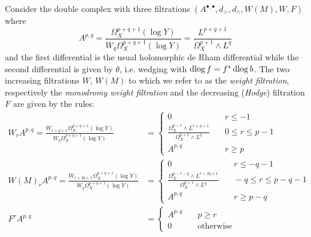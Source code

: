 \documentclass[../main.tex]{subfiles}
\begin{document}
Consider the double complex with three filtrations $(A^{\bullet, \bullet}, d_>, d_\wedge, W(M), W, F)$ where
\[
A^{p,q}= \frac{\Omega^{p+q+1}_{{X}}(\log Y)}{W_q \Omega^{p+q+1}_{{X}}(\log Y)} = \frac{L^{p+q+1}}{\Omega_X^{p+1} \wedge L^q}  
\]
and the first differential is the usual holomorphic de Rham differential while the second differential is given by $\theta$, i.e. wedging with $\operatorname{dlog} f = f^*\operatorname{dlog} b$.
The two increasing filtrations $W$, $W(M)$ to which we refer to as the \emph{weight filtration}, respectively the \emph{monodromy
weight filtration} and the decreasing (\emph{Hodge}) filtration $F$ are given by the rules:
\begin{align*}
W_r A^{p,q} = \frac{W_{r+q+1} \Omega^{p+q+1}_{{X}}(\log Y) }{W_q\Omega^{p+q+1}_{{X}}(\log Y)} &= 
 \left\{\begin{array}{ll} 
 0 &\quad r \leq -1 \\ 
 \frac{ \Omega_X^{p-r} \wedge  L^{r+q+1} }{ \Omega_X^{p+1} \wedge  L^{q} } &\quad 0 \leq r \leq p - 1 \\
 A^{p,q} &\quad r \geq p \end{array}\right.\\
W(M)_rA^{p,q} = \frac{W_{r+2q+1} \Omega^{p+q+1}_{{X}}(\log Y)}{W_q\Omega^{p+q+1}_{{X}}(\log Y)} &= 
 \left\{\begin{array}{ll} 
 0 &\quad r \leq -q-1 \\ 
 \frac{ \Omega_X^{p-r-q} \wedge  L^{r+2q+1} }{ \Omega_X^{p+1} \wedge  L^{q} } &\quad -q \leq r \leq p-q-1 \\
 A^{p,q} &\quad r \geq p-q \end{array}\right.\\
F^rA^{p,q} &= 
 \left\{\begin{array}{ll} 
 A^{p,q} &\quad p \geq r \\ 
0 &\quad \text{otherwise}  \end{array}\right.\\
\end{align*}
\end{document}

